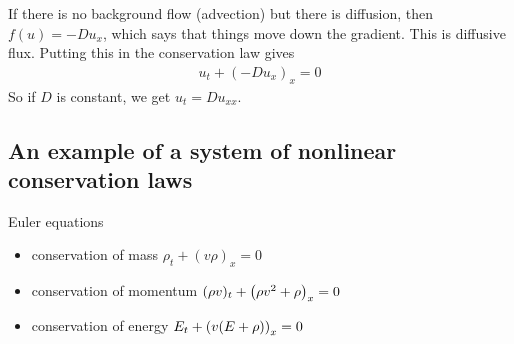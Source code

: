 \documentclass{article}
\begin{document}
        If there is no background flow (advection) but there is diffusion, then $f(u) = -Du_{x}$, which says that things move down the gradient.  This is diffusive flux.  Putting this in the conservation law gives
        \begin{align*}
            u_t + (-Du_x)_x = 0
        \end{align*}
        So if $D$ is constant, we get $u_t = Du_{xx}$.

        \subsection{An example of a system of nonlinear conservation laws}
            Euler equations
            \begin{itemize}
                \item conservation of mass $\rho_t + (v\rho)_x = 0$
                \item conservation of momentum $(\rho v)_t + \qty(\rho v^2 + \rho)_x = 0$
                \item conservation of energy $E_t + \qty(v(E + \rho))_x = 0$
            \end{itemize}
\end{document}
